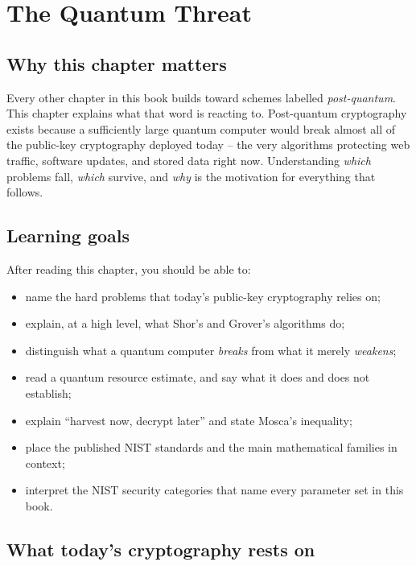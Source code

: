 \chapter{The Quantum Threat}
\label{ch:quantum}

\section{Why this chapter matters}

Every other chapter in this book builds toward schemes labelled \emph{post-quantum}. This chapter explains what that word is reacting to. Post-quantum cryptography exists because a sufficiently large quantum computer would break almost all of the public-key cryptography deployed today -- the very algorithms protecting web traffic, software updates, and stored data right now. Understanding \emph{which} problems fall, \emph{which} survive, and \emph{why} is the motivation for everything that follows.

\section{Learning goals}

After reading this chapter, you should be able to:

\begin{itemize}
  \item name the hard problems that today's public-key cryptography relies on;
  \item explain, at a high level, what Shor's and Grover's algorithms do;
  \item distinguish what a quantum computer \emph{breaks} from what it merely \emph{weakens};
  \item read a quantum resource estimate, and say what it does and does not establish;
  \item explain ``harvest now, decrypt later'' and state Mosca's inequality;
  \item place the published NIST standards and the main mathematical families in context;
  \item interpret the NIST security categories that name every parameter set in this book.
\end{itemize}

\section{What today's cryptography rests on}

